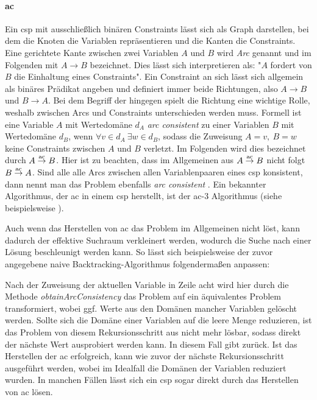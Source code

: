\paragraph{\acl*{ac}} Ein \ac*{csp} mit ausschließlich binären Constraints lässt 
sich als Graph darstellen, bei dem die Knoten die Variablen repräsentieren und die Kanten die Constraints. Eine gerichtete Kante zwischen zwei Variablen $A$ und $B$ wird \textit{Arc}
genannt und im Folgenden mit $A \rightarrow B$ bezeichnet. Dies lässt sich interpretieren als: "$A$ fordert von $B$ die Einhaltung eines Constraints". Ein Constraint an sich lässt
sich allgemein als binäres Prädikat angeben und definiert immer beide Richtungen, also $A \rightarrow B$ und $B \rightarrow A$. Bei dem Begriff der  hingegen spielt die
Richtung eine wichtige Rolle, weshalb zwischen Arcs und Constraints unterschieden werden muss. Formell ist eine Variable $A$ mit Wertedomäne $d_A$ \textit{arc consistent} zu einer
Variablen $B$ mit Wertedomäne $d_B$, wenn $\forall v \in d_A \ \exists w \in d_B$, sodass die Zuweisung $A = v, \ B = w$ keine Constraints zwischen $A$ und $B$ verletzt. Im Folgenden
wird dies bezeichnet durch $A \stackrel{\text{ac}}{\rightarrow} B$. Hier ist zu beachten, dass im Allgemeinen aus $A \stackrel{\text{ac}}{\rightarrow} B$ nicht folgt $B \stackrel{\text{ac}}{\rightarrow} A$. Sind alle alle Arcs zwischen allen Variablenpaaren
eines \ac*{csp} konsistent, dann nennt man das Problem ebenfalls \textit{arc consistent} \cite{ACOverview}. Ein bekannter Algorithmus, der \ac*{ac} in einem \ac*{csp} herstellt,
ist der \ac*{ac}-3 Algorithmus (siehe beispielsweise \cite{ac3}). 

Auch wenn das Herstellen von \ac*{ac} das Problem im Allgemeinen nicht löst, kann dadurch der effektive Suchraum verkleinert werden, wodurch die Suche nach einer Lösung beschleunigt
werden kann. So lässt sich beispielsweise der zuvor angegebene naive Backtracking-Algorithmus folgendermaßen anpassen:

Nach der Zuweisung der aktuellen Variable in Zeile acht wird hier durch die Methode \textit{obtainArcConsistency} das Problem auf ein äquivalentes Problem transformiert, wobei
ggf. Werte aus den Domänen mancher Variablen gelöscht werden. Sollte sich die Domäne einer Variablen auf die leere Menge reduzieren, ist das Problem von diesem Rekursionsschritt
aus nicht mehr lösbar, sodass direkt der nächste Wert ausprobiert werden kann. In diesem Fall gibt   zurück. Ist das Herstellen der
\ac*{ac} erfolgreich, kann wie zuvor der nächste Rekursionsschritt ausgeführt werden, wobei im Idealfall die Domänen der Variablen reduziert wurden. In manchen Fällen lässt sich ein
\ac*{csp} sogar direkt durch das Herstellen von \ac*{ac} lösen.